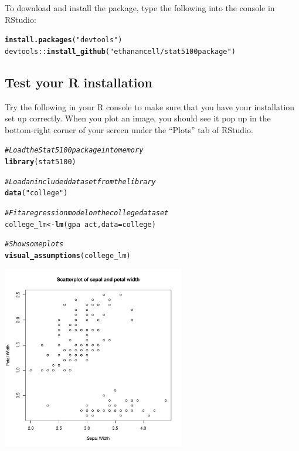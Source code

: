 \documentclass{article}\usepackage[]{graphicx}\usepackage[]{color}
\makeatletter
\newcommand{\hlstr}[1]{\textcolor[rgb]{0.192,0.494,0.8}{#1}}%
\newcommand{\hlcom}[1]{\textcolor[rgb]{0.678,0.584,0.686}{\textit{#1}}}%
\newcommand{\hlopt}[1]{\textcolor[rgb]{0,0,0}{#1}}%
\newcommand{\hlstd}[1]{\textcolor[rgb]{0.345,0.345,0.345}{#1}}%
\newcommand{\hlkwb}[1]{\textcolor[rgb]{0.69,0.353,0.396}{#1}}%
\newcommand{\hlkwc}[1]{\textcolor[rgb]{0.333,0.667,0.333}{#1}}%
\newcommand{\hlkwd}[1]{\textcolor[rgb]{0.737,0.353,0.396}{\textbf{#1}}}%
\newenvironment{kframe}{%
 \def\at@end@of@kframe{}%
 \ifinner\ifhmode%
  \def\at@end@of@kframe{\end{minipage}}%
  \begin{minipage}{\columnwidth}%
 \fi\fi%
 \def\FrameCommand##1{\hskip\@totalleftmargin \hskip-\fboxsep
 \colorbox{shadecolor}{##1}\hskip-\fboxsep
     \hskip-\linewidth \hskip-\@totalleftmargin \hskip\columnwidth}%
 \MakeFramed {\advance\hsize-\width
   \@totalleftmargin\z@ \linewidth\hsize
   \@setminipage}}%
 {\par\unskip\endMakeFramed%
 \at@end@of@kframe}
\newenvironment{knitrout}{}{} %
\makeatother
\begin{document}
To download and install the package, type the following into the console in RStudio:

\begin{knitrout}
\color{fgcolor}\begin{kframe}
\begin{alltt}
\hlkwd{install.packages}\hlstd{(}\hlstr{"devtools"}\hlstd{)}
\hlstd{devtools}\hlopt{::}\hlkwd{install_github}\hlstd{(}\hlstr{"ethanancell/stat5100package"}\hlstd{)}
\end{alltt}
\end{kframe}
\end{knitrout}

\subsection{Test your R installation}

Try the following in your R console to make sure that you have your installation set up correctly. When you plot an image, you should see it pop up in the bottom-right corner of your screen under the ``Plots'' tab of RStudio.

\begin{knitrout}
\color{fgcolor}\begin{kframe}
\begin{alltt}
\hlcom{# Load the Stat 5100 package into memory}
\hlkwd{library}\hlstd{(stat5100)}

\hlcom{# Load an included dataset from the library}
\hlkwd{data}\hlstd{(}\hlstr{"college"}\hlstd{)}

\hlcom{# Fit a regression model on the college dataset}
\hlstd{college_lm} \hlkwb{<-} \hlkwd{lm}\hlstd{(gpa} \hlopt{~} \hlstd{act,} \hlkwc{data} \hlstd{= college)}

\hlcom{# Show some plots}
\hlkwd{visual_assumptions}\hlstd{(college_lm)}
\end{alltt}
\end{kframe}
\includegraphics[width=0.6\textwidth]{figure/unnamed-chunk-2-1} 

\end{knitrout}
\end{document}
